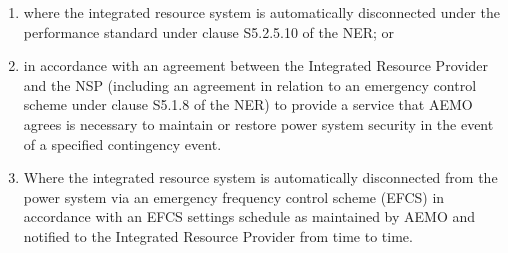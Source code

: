 \begin{enumerate}[label=(\alph*)]
\begin{enumerate}[label=(\arabic*)]
		\item where the integrated resource system is automatically disconnected under the performance standard under clause S5.2.5.10 of the NER; or
		\item in accordance with an agreement between the Integrated Resource Provider and the NSP (including an agreement in relation to an emergency control scheme under clause S5.1.8 of the NER) to provide a service that AEMO agrees is necessary to maintain or restore power system security in the event of a specified contingency event.
		\item Where the integrated resource system is automatically disconnected from the power system via an emergency frequency control scheme (EFCS) in accordance with an EFCS settings schedule as maintained by AEMO and notified to the Integrated Resource Provider from time to time.
	\end{enumerate}

\end{enumerate}
